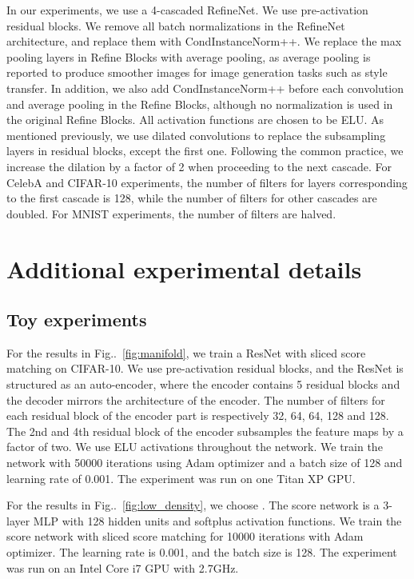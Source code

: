 \documentclass{article}
\makeatletter
\def\@onedot{\ifx\@let@token.\else.\null\fi\xspace}
\DeclareRobustCommand\onedot{\futurelet\@let@token\@onedot}
\newcommand{\figref}[1]{Fig\onedot~\ref{#1}}
\makeatother
\begin{document}
In our experiments, we use a 4-cascaded RefineNet. We use pre-activation residual blocks. We remove all batch normalizations in the RefineNet architecture, and replace them with CondInstanceNorm++. We replace the max pooling layers in Refine Blocks with average pooling, as average pooling is reported to produce smoother images for image generation tasks such as style transfer. In addition, we also add CondInstanceNorm++ before each convolution and average pooling in the Refine Blocks, although no normalization is used in the original Refine Blocks. All activation functions are chosen to be ELU. As mentioned previously, we use dilated convolutions to replace the subsampling layers in residual blocks, except the first one. Following the common practice, we increase the dilation by a factor of 2 when proceeding to the next cascade. For CelebA and CIFAR-10 experiments, the number of filters for layers corresponding to the first cascade is 128, while the number of filters for other cascades are doubled. For MNIST experiments, the number of filters are halved. 


\section{Additional experimental details} \label{app:exp}
\subsection{Toy experiments}\label{app:exp:toy}
For the results in \figref{fig:manifold}, we train a ResNet with sliced score matching on CIFAR-10. We use pre-activation residual blocks, and the ResNet is structured as an auto-encoder, where the encoder contains 5 residual blocks and the decoder mirrors the architecture of the encoder. The number of filters for each residual block of the encoder part is respectively 32, 64, 64, 128 and 128. The 2nd and 4th residual block of the encoder subsamples the feature maps by a factor of two. We use ELU activations throughout the network. We train the network with 50000 iterations using Adam optimizer and a batch size of 128 and learning rate of 0.001. The experiment was run on one Titan XP GPU.

For the results in \figref{fig:low_density}, we choose . The score network is a 3-layer MLP with 128 hidden units and softplus activation functions. We train the score network with sliced score matching for 10000 iterations with Adam optimizer. The learning rate is 0.001, and the batch size is 128. The experiment was run on an Intel Core i7 GPU with 2.7GHz.
\end{document}
